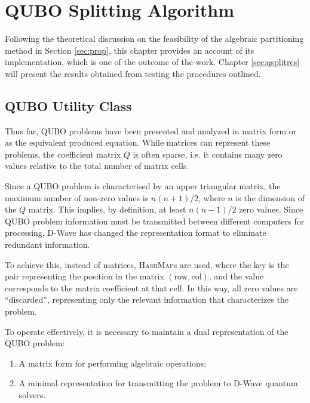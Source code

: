 \chapter{QUBO Splitting Algorithm}

Following the theoretical discussion on the feasibility of the algebraic partitioning method in Section \ref{sec:prop}, this chapter provides an account of its implementation, which is one of the outcome of the work. 
Chapter \ref{sec:qsplitres} will present the results obtained from testing the procedures outlined.

\section{QUBO Utility Class}

Thus far, QUBO problems have been presented and analyzed in matrix form or as the equivalent produced equation. 
While matrices can represent these problems, the coefficient matrix $Q$ is often sparse, i.e. it contains many zero values relative to the total number of matrix cells.

Since a QUBO problem is characterised by an upper triangular matrix, the maximum number of non-zero values is $n(n+1)/2$, where $n$ is the dimension of the $Q$ matrix. 
This implies, by definition, at least $n(n-1)/2$ zero values. Since QUBO problem information must be transmitted between different computers for processing, D-Wave has changed the representation format to eliminate redundant information.

To achieve this, instead of matrices, \textsc{HashMap}s are used, where the key is the pair representing the position in the matrix $(\text{row}, \text{col})$, and the value corresponds to the matrix coefficient at that cell. 
In this way, all zero values are ``discarded'', representing only the relevant information that characterizes the problem.

To operate effectively, it is necessary to maintain a dual representation of the QUBO problem: 
\begin{enumerate} 
	\item A matrix form for performing algebraic operations; 
	\item A minimal representation for transmitting the problem to D-Wave quantum solvers. 
\end{enumerate}


